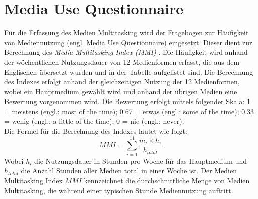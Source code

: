 \section{Media Use Questionnaire}\label{appendix.muq}
Für die Erfassung des Medien Multitasking wird der Fragebogen zur Häufigkeit von Mediennutzung (engl. Media Use Questionnaire) eingesetzt. Dieser dient zur Berechnung des \textit{Media Multitasking Index (MMI)} \cite{Ophir2009}. Die Häufigkeit wird anhand der wöchentlichen Nutzungsdauer von 12 Medienformen erfasst, die aus dem Englischen übersetzt wurden und in der Tabelle  aufgelistet sind. Die Berechnung des Indexes erfolgt anhand der gleichzeitigen Nutzung der 12 Medienformen, wobei ein Hauptmedium gewählt wird und anhand der übrigen Medien eine Bewertung vorgenommen wird. Die Bewertung erfolgt mittels folgender Skala: 1 = meistens (engl.: most of the time); 0.67 = etwas (engl.: some of the time); 0.33 = wenig (engl.: a little of the time); 0 = nie (engl.: never).  \\
Die Formel für die Berechnung des Indexes lautet wie folgt:
\begin{equation}\label{formula.mmi}
    MMI=\sum_{i=1}^{11} \frac{m_{i} \times h_{i}}{h_{total}}
\end{equation}
Wobei \(h_{i}\) die Nutzungsdauer in Stunden pro Woche für das Hauptmedium und \(h_{total}\) die Anzahl Stunden aller Medien total in einer Woche ist.  Der Medien Multitasking Index \(MMI\) kennzeichnet die durchschnittliche Menge von Medien Multitasking, die während einer typischen Stunde Mediennutzung auftritt.
